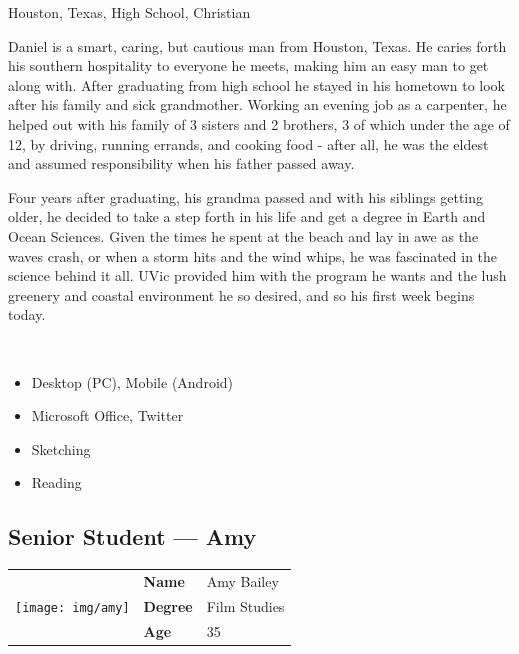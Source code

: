 \documentclass{article}
\begin{document}
\begin{description}[leftmargin=\parindent,labelindent=\parindent]
    \item[Demographics] Houston, Texas, High School, Christian

    \item[Background] Daniel is a smart, caring, but cautious man from Houston, Texas. He caries forth his southern hospitality to everyone he meets, making him an easy man to get along with. After graduating from high school he stayed in his hometown to look after his family and sick grandmother. Working an evening job as a carpenter, he helped out with his family of 3 sisters and 2 brothers, 3 of which under the age of 12, by driving, running errands, and cooking food - after all, he was the eldest and assumed responsibility when his father passed away.
    
    Four years after graduating, his grandma passed and with his siblings getting older, he decided to take a step forth in his life and get a degree in Earth and Ocean Sciences. Given the times he spent at the beach and lay in awe as the waves crash, or when a storm hits and the wind whips, he was fascinated in the science behind it all. UVic provided him with the program he wants and the lush greenery and coastal environment he so desired, and so his first week begins today.
    
    \item[Habits]~\\
    
    \begin{itemize}
        \item Desktop (PC), Mobile (Android)
        \item Microsoft Office, Twitter
        \item Sketching
        \item Reading
    \end{itemize}

\end{description}

\subsection{Senior Student --- Amy}

\begin{tabular}{lll}
    \multirow{3}{*}{\texttt{[image: img/amy]}} & \textbf{Name} & Amy Bailey \\
    & \textbf{Degree} & Film Studies \\
    & \textbf{Age} & 35 \\
\end{tabular}
\end{document}
